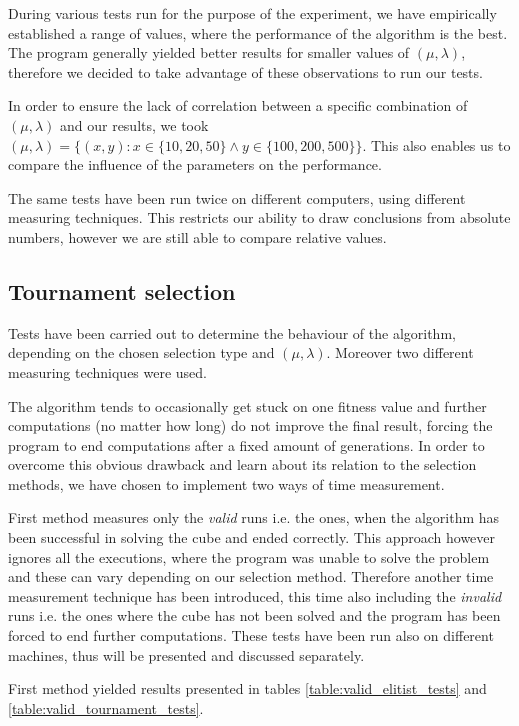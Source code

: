 \documentclass[a4paper]{article}
\begin{document}
During various tests run for the purpose of the experiment, we have empirically established a range of values, where the performance of the algorithm is the best. The program generally yielded better results for smaller values of $(\mu, \lambda)$, therefore we decided to take advantage of these observations to run our tests.

In order to ensure the lack of correlation between a specific combination of $(\mu, \lambda)$ and our results, we took  $(\mu, \lambda) = \{(x,y) : x \in \{10, 20, 50\} \wedge y \in \{100, 200, 500\}\}$. This also enables us to compare the influence of the parameters on the performance.

The same tests have been run twice on different computers, using different measuring techniques. This restricts our ability to draw conclusions from absolute numbers, however we are still able to compare relative values.

\subsection{Tournament selection}

Tests have been carried out to determine the behaviour of the algorithm, depending on the chosen selection type and $(\mu, \lambda)$. Moreover two different measuring techniques were used.

The algorithm tends to occasionally get stuck on one fitness value and further computations (no matter how long) do not improve the final result, forcing the program to end computations after a fixed amount of generations. In order to overcome this obvious drawback and learn about its relation to the selection methods, we have chosen to implement two ways of time measurement.

First method measures only the \textit{valid} runs i.e. the ones, when the algorithm has been successful in solving the cube and ended correctly. This approach however ignores all the executions, where the program was unable to solve the problem and these can vary depending on our selection method. Therefore another time measurement technique has been introduced, this time also including the \textit{invalid} runs i.e. the ones where the cube has not been solved and the program has been forced to end further computations. These tests have been run also on different machines, thus will be presented and discussed separately.

First method yielded results presented in tables \ref{table:valid_elitist_tests} and \ref{table:valid_tournament_tests}.
\end{document}
